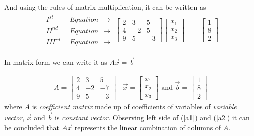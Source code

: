 \documentclass{article}
\begin{document}
And using the rules of matrix multiplication, it can be written as
    \begin{align}
        \begin{matrix}
            I^{st}~~&Equation~~\longrightarrow\\
            II^{nd}~~&Equation~~\longrightarrow\\
            III^{rd}~~&Equation~~\longrightarrow
        \end{matrix}
                     \begin{bmatrix}
                        2 & 3 & 5\\
                        4 & -2 & 5\\
                        9 & 5 & -3
                   \end{bmatrix} \begin{bmatrix}
                                    x_1 \\ x_2 \\ x_3
                                 \end{bmatrix} &= \begin{bmatrix}
                                                    1 \\ 8 \\ 2
                                                  \end{bmatrix} \label{a2}
    \end{align}
    
    In matrix form we can write it as $A\vec{x} = \vec{b}$
    
    \begin{align}
        A = \begin{bmatrix}
                2 & 3 & 5 \\
                4 & -2 & -7 \\
                9 & 5 & -3
            \end{bmatrix} ~~~~ \vec{x} = \begin{bmatrix}
                                            x_1 \\
                                            x_2 \\
                                            x_3
                                         \end{bmatrix}\text{ and } \vec{b} = \begin{bmatrix}
                                            1 \\
                                            8 \\
                                            2
                                         \end{bmatrix} \nonumber
    \end{align}
where $A$ is \textit{coefficient matrix} made up of coefficients of variables of \textit{variable vector}, $\vec{x}$ and $\vec{b}$ is \textit{constant vector}. Observing left side of (\ref{a1}) and (\ref{a2}) it can be concluded that $A\vec{x}$ represents the linear combination of columns of $A$.\\
\end{document}
